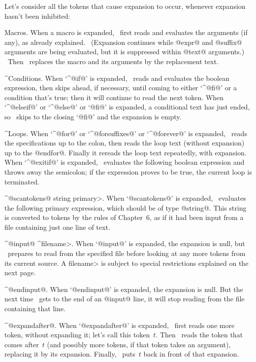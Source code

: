 \ddanger Let's consider all the tokens that cause expansion to occur,
whenever expansion hasn't been inhibited:\enddanger

\nobreak\medskip
\textindent\bull Macros. When a macro is expanded, \MF\ first reads and
evaluates the arguments (if any), as already explained.
\ (Expansion continues while @expr@ and @suffix@ arguments are
being evaluated, but it is suppressed within @text@ arguments.) \
Then \MF\ replaces the macro and its arguments by the replacement text.

\smallbreak
\textindent\bull ^{Conditions}. When `^@if@\kern1pt' is expanded, \MF\
reads and evaluates the boolean expression, then skips ahead, if necessary,
until coming to either `^@fi@' or a condition that's true; then it will
continue to read the next token. When `^@elseif@\kern1pt' or `^@else@'
or `@fi@' is expanded, a conditional text has just ended, so \MF\
skips to the closing `@fi@' and the expansion is empty.

\smallbreak
\textindent\bull ^{Loops}. When `^@for@' or `^@forsuffixes@' or
`^@forever@' is expanded, \MF\ reads the specifications up to the colon,
then reads the loop text (without expansion) up to the @endfor@.
Finally it rereads the loop text repeatedly, with expansion. When
`^@exitif@\kern1pt' is expanded, \MF\ evaluates the following boolean
expression and throws away the semicolon; if the expression proves
to be true, the current loop is terminated.

\smallbreak
\textindent\bull ^@scantokens@ \<string primary>. When `@scantokens@'
is expanded, \MF\ evaluates the following primary expression, which
should be of type @string@. This string is converted to tokens by the
rules of Chapter~6, as if
it had been input from a file containing just one line of text.

\smallbreak
\textindent\bull ^@input@ ^\<filename>. When `@input@' is expanded,
the expansion is null, but \MF\ prepares to read from the specified
file before looking at any more tokens from its current source.
A \<filename> is subject to special restrictions explained on the
next page.

\smallbreak
\textindent\bull ^@endinput@. When `@endinput@' is expanded, the
expansion is null. But the next time \MF\ gets to the end of an
@input@ line, it will stop reading from the file containing that line.

\smallbreak
\textindent\bull ^@expandafter@. When `@expandafter@' is expanded,
\MF\ first reads one more token, without expanding it; let's
call this token~$t$. Then \MF\ reads the token that comes after~$t$
(and possibly more tokens, if that token takes an argument),
replacing it by its expansion. Finally, \MF\ puts~$t$ back in front
of that expansion.

